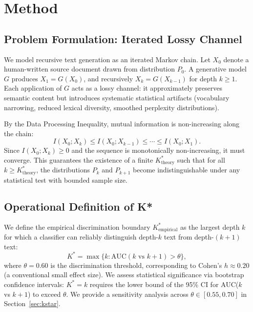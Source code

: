 \documentclass[11pt,a4paper]{article}
\begin{document}
\section{Method}
\label{sec:method}

\subsection{Problem Formulation: Iterated Lossy Channel}

We model recursive text generation as an iterated Markov chain. Let $X_0$ denote a human-written source document drawn from distribution $P_0$. A generative model $G$ produces $X_1 = G(X_0)$, and recursively $X_k = G(X_{k-1})$ for depth $k \geq 1$. Each application of $G$ acts as a lossy channel: it approximately preserves semantic content but introduces systematic statistical artifacts (vocabulary narrowing, reduced lexical diversity, smoothed perplexity distributions).

By the Data Processing Inequality, mutual information is non-increasing along the chain:
\begin{equation}
    I(X_0; X_k) \leq I(X_0; X_{k-1}) \leq \cdots \leq I(X_0; X_1).
\end{equation}
Since $I(X_0; X_k) \geq 0$ and the sequence is monotonically non-increasing, it must converge. This guarantees the existence of a finite $K^*_{\text{theory}}$ such that for all $k \geq K^*_{\text{theory}}$, the distributions $P_k$ and $P_{k+1}$ become indistinguishable under any statistical test with bounded sample size.

\subsection{Operational Definition of K*}

We define the empirical discrimination boundary $K^*_{\text{empirical}}$ as the largest depth $k$ for which a classifier can reliably distinguish depth-$k$ text from depth-$(k{+}1)$ text:
\begin{equation}
    K^* = \max\{k : \text{AUC}(k \text{ vs } k{+}1) > \theta\},
\end{equation}
where $\theta = 0.60$ is the discrimination threshold, corresponding to Cohen's $h \approx 0.20$ (a conventional small effect size). We assess statistical significance via bootstrap confidence intervals: $K^*{=}k$ requires the lower bound of the 95\% CI for AUC($k$ vs $k{+}1$) to exceed $\theta$. We provide a sensitivity analysis across $\theta \in [0.55, 0.70]$ in Section~\ref{sec:kstar}.
\end{document}
